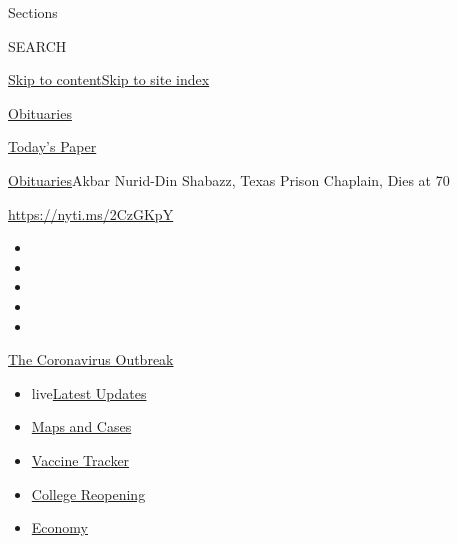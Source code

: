 Sections

SEARCH

\protect\hyperlink{site-content}{Skip to
content}\protect\hyperlink{site-index}{Skip to site index}

\href{https://www.nytimes3xbfgragh.onion/section/obituaries}{Obituaries}

\href{https://myaccount.nytimes3xbfgragh.onion/auth/login?response_type=cookie\&client_id=vi}{}

\href{https://www.nytimes3xbfgragh.onion/section/todayspaper}{Today's
Paper}

\href{/section/obituaries}{Obituaries}\textbar{}Akbar Nurid-Din Shabazz,
Texas Prison Chaplain, Dies at 70

\url{https://nyti.ms/2CzGKpY}

\begin{itemize}
\item
\item
\item
\item
\item
\end{itemize}

\href{https://www.nytimes3xbfgragh.onion/news-event/coronavirus?action=click\&pgtype=Article\&state=default\&region=TOP_BANNER\&context=storylines_menu}{The
Coronavirus Outbreak}

\begin{itemize}
\tightlist
\item
  live\href{https://www.nytimes3xbfgragh.onion/2020/08/04/world/coronavirus-covid-19.html?action=click\&pgtype=Article\&state=default\&region=TOP_BANNER\&context=storylines_menu}{Latest
  Updates}
\item
  \href{https://www.nytimes3xbfgragh.onion/interactive/2020/us/coronavirus-us-cases.html?action=click\&pgtype=Article\&state=default\&region=TOP_BANNER\&context=storylines_menu}{Maps
  and Cases}
\item
  \href{https://www.nytimes3xbfgragh.onion/interactive/2020/science/coronavirus-vaccine-tracker.html?action=click\&pgtype=Article\&state=default\&region=TOP_BANNER\&context=storylines_menu}{Vaccine
  Tracker}
\item
  \href{https://www.nytimes3xbfgragh.onion/2020/08/02/us/covid-college-reopening.html?action=click\&pgtype=Article\&state=default\&region=TOP_BANNER\&context=storylines_menu}{College
  Reopening}
\item
  \href{https://www.nytimes3xbfgragh.onion/live/2020/08/03/business/stock-market-today-coronavirus?action=click\&pgtype=Article\&state=default\&region=TOP_BANNER\&context=storylines_menu}{Economy}
\end{itemize}

